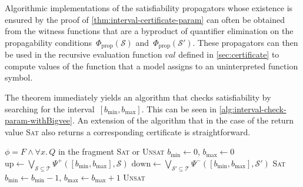 \documentclass[runningheads]{llncs}
\newcommand{\smt}{\textsc{smt}}
\begin{document}
Algorithmic implementations of the satisfiability propagators whose existence is ensured by the proof of \cref{thm:interval-certificate-param} can often be obtained from the witness functions that are 
a byproduct of quantifier elimination on the
propagability conditions~$\Phi_{\text{prop}}(\mathcal{S})$ and~$\Phi_{\text{prop}}(\mathcal{S}')$. These propagators  can then be used in the recursive evaluation function $val$ defined in \cref{sec:certificate} to compute values of the function that a model assigns to an uninterpreted function symbol.

The theorem immediately yields an algorithm that checks satisfiability by searching for the interval~$[b_{\min},b_{\max}]$. This can be seen in \cref{alg:interval-check-param-withBigvee}. An extension of the algorithm that in the case of the return value \textsc{Sat} also returns a corresponding certificate is straightforward.

\begin{algorithm}
\caption{Interval‑Based Satisfiability Check}
\label{alg:interval-check-param-withBigvee}
\begin{algorithmic}[1]
\Require $\phi = F \land \forall x.\, Q$ in the fragment
\Ensure \textsc{Sat} or \textsc{Unsat}
\State $b_{\min} \gets 0$, $b_{\max} \gets 0$ 
    \State $\text{up}\gets\bigvee_{\mathcal{S}\subseteq \mathcal{T}}\Psi^+([b_{\min},b_{\max}],\mathcal{S})$
    \State $\text{down}\gets\bigvee_{{\mathcal{S}'\subseteq \mathcal{T}}}\Psi^-([b_{\min},b_{\max}],\mathcal{S}')$ 
        \State \Return \textsc{Sat} 
    \EndIf
    \State $b_{\min} \gets b_{\min} - 1$, $b_{\max} \gets b_{\max} + 1$ 
\EndWhile
\State \Return \textsc{Unsat}
\end{algorithmic}
\end{algorithm}



\end{document}
